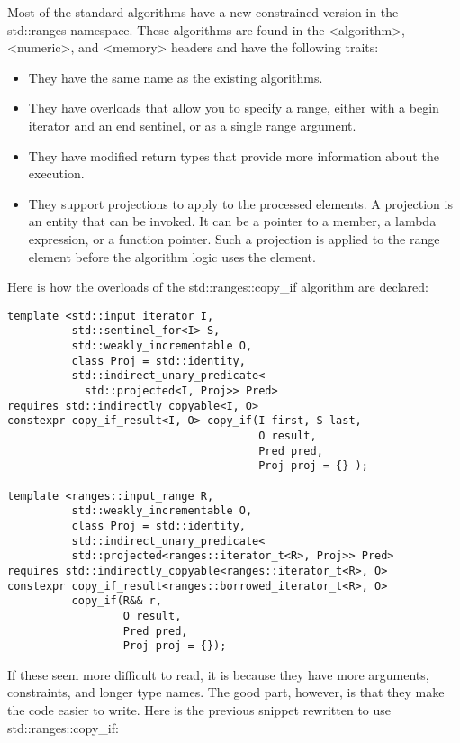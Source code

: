Most of the standard algorithms have a new constrained version in the std::ranges namespace. These algorithms are found in the <algorithm>, <numeric>, and <memory> headers and have the following traits:

\begin{itemize}
\item
They have the same name as the existing algorithms.

\item
They have overloads that allow you to specify a range, either with a begin iterator and an end sentinel, or as a single range argument.

\item
They have modified return types that provide more information about the execution.

\item
They support projections to apply to the processed elements. A projection is an entity that can be invoked. It can be a pointer to a member, a lambda expression, or a function pointer. Such a projection is applied to the range element before the algorithm logic uses the element.
\end{itemize}

Here is how the overloads of the std::ranges::copy\_if algorithm are declared:

\begin{lstlisting}[style=styleCXX]
template <std::input_iterator I,
		  std::sentinel_for<I> S,
		  std::weakly_incrementable O,
		  class Proj = std::identity,
		  std::indirect_unary_predicate<
		    std::projected<I, Proj>> Pred>
requires std::indirectly_copyable<I, O>
constexpr copy_if_result<I, O> copy_if(I first, S last,
									   O result,
								   	   Pred pred,
									   Proj proj = {} );
									   
template <ranges::input_range R,
		  std::weakly_incrementable O,
		  class Proj = std::identity,
		  std::indirect_unary_predicate<
		  std::projected<ranges::iterator_t<R>, Proj>> Pred>
requires std::indirectly_copyable<ranges::iterator_t<R>, O>
constexpr copy_if_result<ranges::borrowed_iterator_t<R>, O>
		  copy_if(R&& r,
				  O result,
				  Pred pred,
				  Proj proj = {});
\end{lstlisting}

If these seem more difficult to read, it is because they have more arguments, constraints, and longer type names. The good part, however, is that they make the code easier to write. Here is the previous snippet rewritten to use std::ranges::copy\_if:

